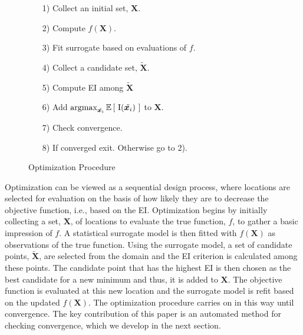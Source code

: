 \documentclass{article}
\newcommand{\E}[1]{
        \mathbb{E}\left[~#1~\right]
}
\newcommand{\argmax}{\operatornamewithlimits{argmax}}
\def \Eix {
        \mathbb{E}\left[~\text{I}(\bm{x})~\right]
}
\begin{document}
%
%
\begin{figure}
	\vspace{-0.8cm}
        \singlespacing
        \caption{Optimization Procedure}
        \begin{itemize}
        \item[1)] Collect an initial set, $\bm{X}$.
        \item[2)] Compute $f(\bm{X})$.
        \item[3)] Fit surrogate based on evaluations of $f$.
        \item[4)] Collect a candidate set, $\tilde{\bm{X}}$.
        \item[5)] Compute EI among $\tilde{\bm{X}}$
        \item[6)] Add $\argmax_{\tilde{\bm{x}_i}} \E{\text{I}(\tilde{\bm{x}_i})}$ to $\bm{X}$.
        \item[7)] Check convergence.
        \item[8)] If converged exit. Otherwise go to 2).
        \end{itemize}
        \doublespacing
        \label{procedure}
\end{figure}
%
Optimization can be viewed as a sequential design process, where locations are 
selected for evaluation on the basis of how likely they are to decrease the 
objective function, i.e., based on the EI. Optimization begins by initially 
collecting a set, $\bm{X}$, of locations to evaluate the true function, $f$, 
to gather a basic impression of $f$. A statistical surrogate model is then 
fitted with $f(\bm{X})$ as observations of the true function. Using the 
surrogate model, a set of candidate points, $\tilde{\bm{X}}$, are selected 
from the domain and the EI criterion is calculated among these points. The 
candidate point that has the highest EI is then chosen as the best candidate for 
a new minimum and thus, it is added to $\bm{X}$. The objective function is 
evaluated at this new location and the surrogate model is refit based on the 
updated $f(\bm{X})$. The optimization procedure carries on in this way until 
convergence. The key contribution of this paper is an automated method for 
checking convergence, which we develop in the next section. 
\end{document}
